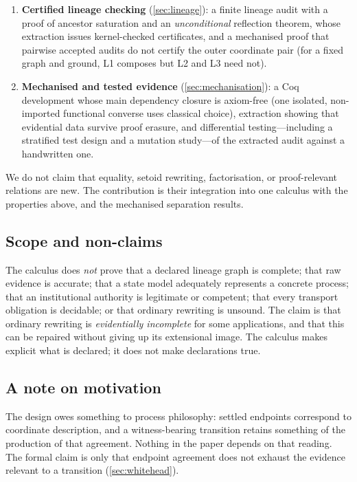 \begin{enumerate}
\item \textbf{Certified lineage checking} (\cref{sec:lineage}): a finite lineage audit with a proof of ancestor saturation and an \emph{unconditional} reflection theorem, whose extraction issues kernel-checked certificates, and a mechanised proof that pairwise accepted audits do not certify the outer coordinate pair (for a fixed graph and ground, L1 composes but L2 and L3 need not).
\item \textbf{Mechanised and tested evidence} (\cref{sec:mechanisation}): a Coq development whose main dependency closure is axiom-free (one isolated, non-imported functional converse uses classical choice), extraction showing that evidential data survive proof erasure, and differential testing---including a stratified test design and a mutation study---of the extracted audit against a handwritten one.
\end{enumerate}
We do not claim that equality, setoid rewriting, factorisation, or proof-relevant relations are new. The contribution is their integration into one calculus with the properties above, and the mechanised separation results.

\subsection{Scope and non-claims}
The calculus does \emph{not} prove that a declared lineage graph is complete; that raw evidence is accurate; that a state model adequately represents a concrete process; that an institutional authority is legitimate or competent; that every transport obligation is decidable; or that ordinary rewriting is unsound. The claim is that ordinary rewriting is \emph{evidentially incomplete} for some applications, and that this can be repaired without giving up its extensional image. The calculus makes explicit what is declared; it does not make declarations true.

\subsection{A note on motivation}
The design owes something to process philosophy: settled endpoints correspond to coordinate description, and a witness-bearing transition retains something of the production of that agreement. Nothing in the paper depends on that reading. The formal claim is only that endpoint agreement does not exhaust the evidence relevant to a transition (\cref{sec:whitehead}).
